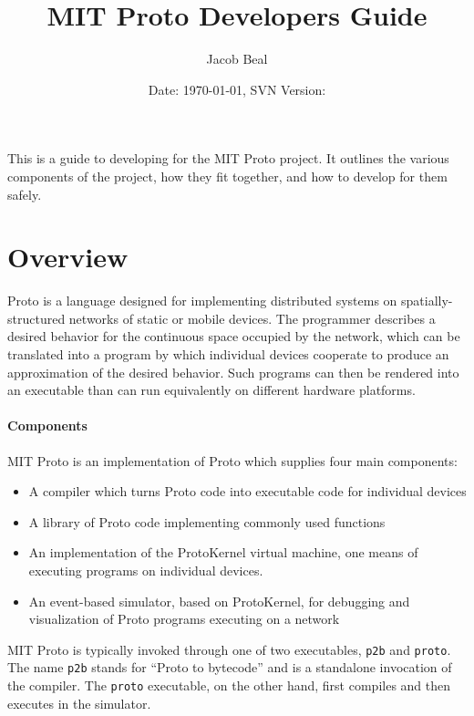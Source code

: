 \documentclass{article}
\title{MIT Proto Developers Guide}
\author{Jacob Beal}
\date{Date: \today, SVN Version: \svnrev{}}
\begin{document}
\maketitle

This is a guide to developing for the MIT Proto project.  It outlines the
various components of the project, how they fit together, and how to
develop for them safely.

\tableofcontents



\section{Overview}

Proto is a language designed for implementing distributed systems on
spatially-structured networks of static or mobile devices.  The
programmer describes a desired behavior for the continuous space
occupied by the network, which can be translated into a program by
which individual devices cooperate to produce an approximation of the
desired behavior.  Such programs can then be rendered into an
executable than can run equivalently on different hardware platforms.

\paragraph{Components}
MIT Proto is an implementation of Proto which supplies four main
components:
\begin{itemize}
\item A compiler which turns Proto code into executable code for
  individual devices
\item A library of Proto code implementing commonly used functions
\item An implementation of the ProtoKernel virtual machine, one means
  of executing programs on individual devices.
\item An event-based simulator, based on ProtoKernel, for debugging
  and visualization of Proto programs executing on a network
\end{itemize}

MIT Proto is typically invoked through one of two executables,
{\tt p2b} and {\tt proto}.  The name {\tt p2b} stands for ``Proto
to bytecode'' and is a standalone invocation of the compiler.  The
{\tt proto} executable, on the other hand, first compiles and then
executes in the simulator.
\end{document}
